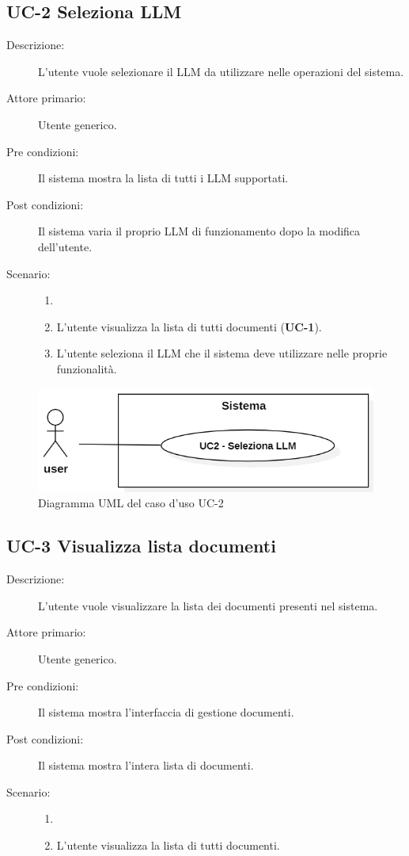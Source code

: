 \subsection{UC-2 Seleziona LLM}
\begin{description}
    \item[Descrizione:] L’utente vuole selezionare il LLM da utilizzare nelle operazioni del sistema.
    \item[Attore primario:] Utente generico.
    \item[Pre condizioni:] Il sistema mostra la lista di tutti i LLM supportati.
    \item[Post condizioni:] Il sistema varia il proprio LLM di funzionamento dopo la modifica dell'utente.
    \item[Scenario:] 
    \begin{enumerate}
        \item[]
        \item L’utente visualizza la lista di tutti documenti (\textbf{UC-1}).
        \item L'utente seleziona il LLM che il sistema deve utilizzare nelle proprie funzionalità.
    \end{enumerate}
\end{description}

\begin{figure}[H]
    \centering
    \includegraphics[width=0.8\linewidth]{UC2.PNG}
    \caption{Diagramma UML del caso d'uso UC-2}
\end{figure}

\subsection{UC-3 Visualizza lista documenti}
\begin{description}
    \item[Descrizione:] L’utente vuole visualizzare la lista dei documenti presenti nel sistema.
    \item[Attore primario:] Utente generico.
    \item[Pre condizioni:] Il sistema mostra l’interfaccia di gestione documenti.
    \item[Post condizioni:] Il sistema mostra l’intera lista di documenti.
    \item[Scenario:] 
    \begin{enumerate}
        \item[]
        \item L’utente visualizza la lista di tutti documenti.
    \end{enumerate}
\end{description}

